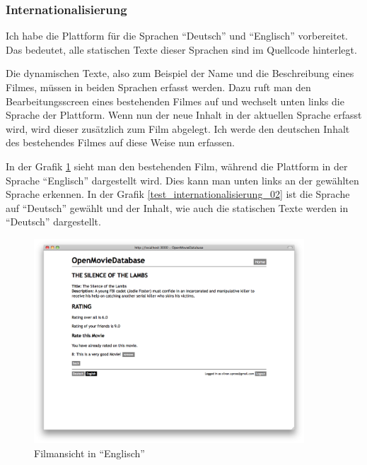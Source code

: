 \clearpage

\subsubsection{Internationalisierung}
Ich habe die Plattform für die Sprachen ``Deutsch'' und ``Englisch'' vorbereitet.
Das bedeutet, alle statischen Texte dieser Sprachen sind im Quellcode hinterlegt.

Die dynamischen Texte, also zum Beispiel der Name und die Beschreibung eines
Filmes, müssen in beiden Sprachen erfasst werden. Dazu ruft man den Bearbeitungsscreen
eines bestehenden Filmes auf und wechselt unten links die Sprache der Plattform.
Wenn nun der neue Inhalt in der aktuellen Sprache erfasst wird, wird dieser 
zusätzlich zum Film abgelegt. Ich werde den deutschen Inhalt des bestehendes Filmes 
auf diese Weise nun erfassen.

In der Grafik \ref{test_internationalisierung_01} sieht man den bestehenden Film,
während die Plattform in der Sprache ``Englisch'' dargestellt wird. Dies kann man
unten links an der gewählten Sprache erkennen. In der Grafik \ref{test_internationalisierung_02}
ist die Sprache auf ``Deutsch'' gewählt und der Inhalt, wie auch die statischen 
Texte werden in ``Deutsch'' dargestellt.

\begin{figure}[ht]
    \begin{center}
        \includegraphics[width=0.9\textwidth,angle=0]{./bilder/tests/test_internationalisierung_01.png}
        \caption{Filmansicht in ``Englisch''}
        \label{test_internationalisierung_01}
    \end{center}
\end{figure}

